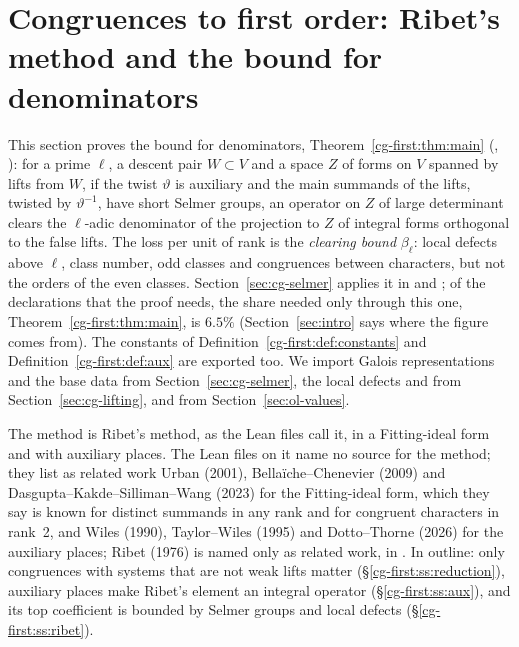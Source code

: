 \section{Congruences to first order: Ribet's method and the bound for denominators}\label{sec:cg-first}

This section proves the bound for denominators, Theorem~\ref{cg-first:thm:main}
(, ):
for a prime $\ell$, a descent pair $W\subset V$ and a space $Z$ of forms on $V$ spanned by lifts from
$W$, if the twist $\vartheta$ is auxiliary and the main summands of the lifts, twisted by
$\vartheta^{-1}$, have short Selmer groups, an operator on $Z$ of large determinant clears the
$\ell$-adic denominator of the projection to $Z$ of integral forms orthogonal to the false lifts. The loss per unit of rank is the \emph{clearing bound} $\beta_\ell$: local defects above $\ell$,
class number, odd classes and congruences between characters, but not the orders of the even classes.
Section~\ref{sec:cg-selmer} applies it in  and
; of the declarations that the proof needs, the share
needed only through this one, Theorem~\ref{cg-first:thm:main}, is $6.5\%$ (Section~\ref{sec:intro} says
where the figure comes from). The constants
of Definition~\ref{cg-first:def:constants} and Definition~\ref{cg-first:def:aux} are exported too. We
import Galois representations and the base data  from
Section~\ref{sec:cg-selmer}, the local defects and
 from Section~\ref{sec:cg-lifting}, and
 from Section~\ref{sec:ol-values}.

The method is Ribet's method, as the Lean files call it, in a Fitting-ideal form and with
auxiliary places. The Lean files on it name no source for the method; they list as related work
Urban (2001), Bella\"iche--Chenevier (2009) and Dasgupta--Kakde--Silliman--Wang (2023) for the
Fitting-ideal form, which they say is known for distinct summands in any rank and for congruent
characters in rank~2, and Wiles (1990), Taylor--Wiles (1995) and Dotto--Thorne (2026) for the
auxiliary places; Ribet (1976) is named only as related work, in
. In outline: only congruences with systems that are not
weak lifts matter (\S\ref{cg-first:ss:reduction}), auxiliary places make Ribet's element an integral
operator (\S\ref{cg-first:ss:aux}), and its top coefficient is bounded by Selmer groups and local
defects (\S\ref{cg-first:ss:ribet}).

